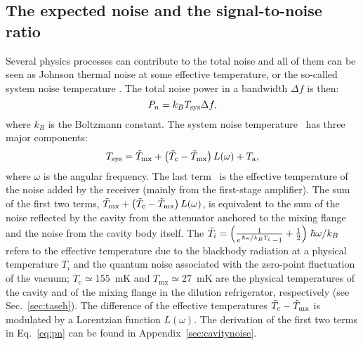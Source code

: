 \subsection{The expected noise and the signal-to-noise ratio}
\label{sec:intronoise}
Several physics processes can contribute to the total noise and all of them 
can be seen as Johnson thermal noise at some effective temperature, or the 
so-called system noise temperature \tsys. The total noise power in a 
bandwidth $\Delta f$ is then:
\begin{equation}
  P_n = k_BT_\text{sys} \Delta f, 
\end{equation}
where $k_B$ is the Boltzmann constant. 
The system noise temperature \tsys\ has three major components: 
\begin{equation}
 T_\text{sys} = \Tilde{T}_\text{mx} + \left(\Tilde{T}_\text{c}-\Tilde{T}_\text{mx}\right)L(\omega) + T_\text{a},
\label{eq:pn}
\end{equation}
where $\omega$ is the angular frequency. 
The last term \ta\ is the effective temperature of the 
noise added by the receiver (mainly from the first-stage amplifier). 
The sum of the first two terms, 
$\Tilde{T}_\text{mx} + \left(\Tilde{T}_\text{c}-\Tilde{T}_\text{mx}\right)L(\omega)$, is equivalent 
to the sum of the noise reflected by the cavity from the attenuator anchored 
to the mixing flange and the noise from the cavity body itself. 
The 
$\Tilde{T}_i=\left(\frac{1}{e^{\left.\hbar\omega\middle/k_BT_i\right.}-1} + \frac{1}{2}\right)\left. \hbar\omega\middle/k_B\right.$ refers to  
the effective temperature due to 
the blackbody radiation at a physical temperature $T_i$ and         
the quantum noise associated with the zero-point fluctuation of the vacuum; 
$T_\text{c}\simeq155$~mK and $T_\text{mx}\simeq27$~mK are the physical 
temperatures of the cavity and of the mixing flange in the dilution 
refrigerator, respectively (see Sec.~\ref{sec:taseh}). The difference 
of the effective temperatures $\Tilde{T}_\text{c}-\Tilde{T}_\text{mx}$ is 
modulated by a Lorentzian function $L(\omega)$. 
The derivation of the first two terms in Eq.~\eqref{eq:pn} can be found in 
Appendix~\ref{sec:cavitynoise}. 
